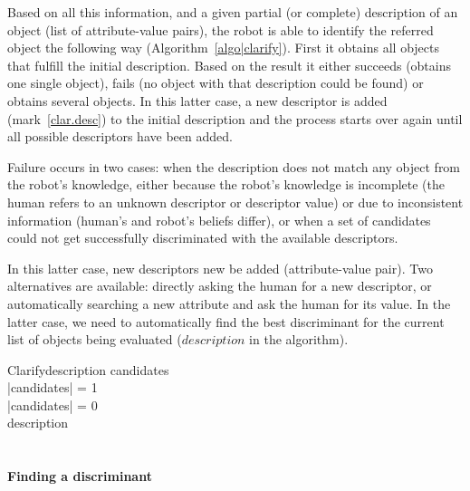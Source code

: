 Based on all this information, and a given partial (or complete) description of
an object (list of attribute-value pairs), the robot is able to identify the
referred object the following way (Algorithm~\ref{algo|clarify}). First it
obtains all objects that fulfill the initial description. Based on the result
it either succeeds (obtains one single object), fails (no object with that
description could be found) or obtains several objects. In this latter case, a
new descriptor is added (mark~\ref{clar.desc}) to the initial description and
the process starts over again until all possible descriptors have been added.

Failure occurs in two cases: when the description does not match any object
from the robot's knowledge, either because the robot's knowledge is incomplete
(the human refers to an unknown descriptor or descriptor value) or due to
inconsistent information (human's and robot's beliefs differ), or when a set of
candidates could not get successfully discriminated with the available
descriptors.

In this latter case, new descriptors new be added (attribute-value pair). Two
alternatives are available: directly asking the human for a new descriptor, or
automatically searching a new attribute and ask the human for its value. In the
latter case, we need to automatically find the best discriminant for the
current list of objects being evaluated ($description$ in the algorithm).


\small
\begin{pseudocode}[ruled]{Clarify}{description}
\label{algo|clarify}
\BEGIN
candidates \GETS {} \\
\IF \left|{candidates}\right| = 1 \THEN {} \\
\ELSEIF \left|{candidates}\right| = 0 \THEN {} \\
\ELSE
    \BEGIN
        description \GETS {} \\
         \\
    \END
\END

\end{pseudocode}
\normalsize

\paragraph{Finding a discriminant}
\label{sect|discriminant}

